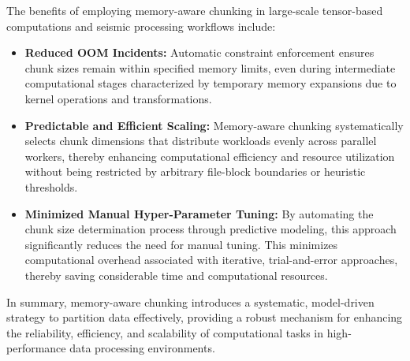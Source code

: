 The benefits of employing memory-aware chunking in large-scale tensor-based computations and seismic processing workflows include:

\begin{itemize}
    
    \item \textbf{Reduced OOM Incidents:} Automatic constraint enforcement ensures chunk sizes remain within specified memory limits, even during intermediate computational stages characterized by temporary memory expansions due to kernel operations and transformations.

    \item \textbf{Predictable and Efficient Scaling:} Memory-aware chunking systematically selects chunk dimensions that distribute workloads evenly across parallel workers, thereby enhancing computational efficiency and resource utilization without being restricted by arbitrary file-block boundaries or heuristic thresholds.

    \item \textbf{Minimized Manual Hyper-Parameter Tuning:} By automating the chunk size determination process through predictive modeling, this approach significantly reduces the need for manual tuning. 
    This minimizes computational overhead associated with iterative, trial-and-error approaches, thereby saving considerable time and computational resources.

\end{itemize}

In summary, memory-aware chunking introduces a systematic, model-driven strategy to partition data effectively, providing a robust mechanism for enhancing the reliability, efficiency, and scalability of computational tasks in high-performance data processing environments.